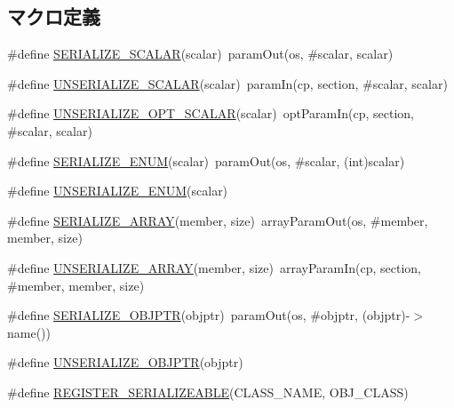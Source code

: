 \subsection*{マクロ定義}
\begin{DoxyCompactItemize}
\item 
\#define \hyperlink{serialize_8hh_a49163149ec656ffecff0e46aee418e29}{SERIALIZE\_\-SCALAR}(scalar)~paramOut(os, \#scalar, scalar)
\item 
\#define \hyperlink{serialize_8hh_a13d18ccba3d8bcbcd5aab2e37c380bff}{UNSERIALIZE\_\-SCALAR}(scalar)~paramIn(cp, section, \#scalar, scalar)
\item 
\#define \hyperlink{serialize_8hh_a4589b5c4561e2466c1318470af9c05bc}{UNSERIALIZE\_\-OPT\_\-SCALAR}(scalar)~optParamIn(cp, section, \#scalar, scalar)
\item 
\#define \hyperlink{serialize_8hh_a27de7db0b923252a717d9f15a7efd019}{SERIALIZE\_\-ENUM}(scalar)~paramOut(os, \#scalar, (int)scalar)
\item 
\#define \hyperlink{serialize_8hh_ad7804ac128f9563f791586cd354b37bb}{UNSERIALIZE\_\-ENUM}(scalar)
\item 
\#define \hyperlink{serialize_8hh_a9aa03522128bc19a3bc0294501226f8b}{SERIALIZE\_\-ARRAY}(member, size)~arrayParamOut(os, \#member, member, size)
\item 
\#define \hyperlink{serialize_8hh_a8de12bf68d0f92f7ab8585820607932e}{UNSERIALIZE\_\-ARRAY}(member, size)~arrayParamIn(cp, section, \#member, member, size)
\item 
\#define \hyperlink{serialize_8hh_a3922729f2834a70a016091e78b914140}{SERIALIZE\_\-OBJPTR}(objptr)~paramOut(os, \#objptr, (objptr)-\/$>$name())
\item 
\#define \hyperlink{serialize_8hh_ab09b68fecdcb77b21e23677ea58fd7ed}{UNSERIALIZE\_\-OBJPTR}(objptr)
\item 
\#define \hyperlink{serialize_8hh_a228ec150f7eca83a3290c919bbd1c432}{REGISTER\_\-SERIALIZEABLE}(CLASS\_\-NAME, OBJ\_\-CLASS)
\end{DoxyCompactItemize}
